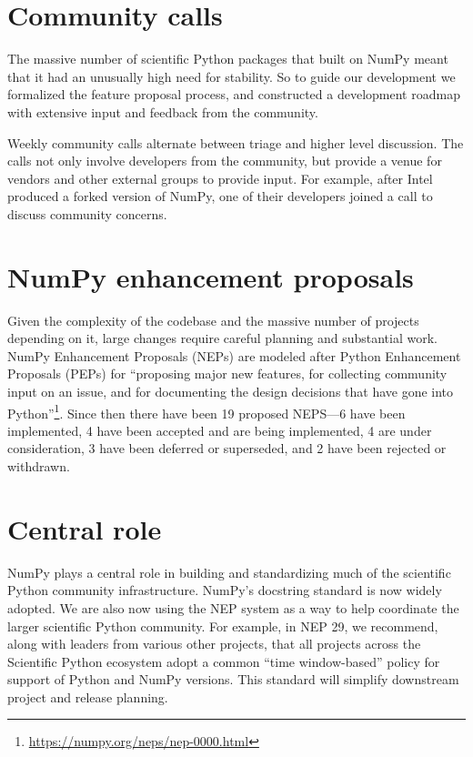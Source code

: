 \section*{Community calls}

The massive number of scientific Python packages that
built on NumPy meant that it had an unusually high need for stability.
So to guide our development we formalized the feature proposal process, and
constructed a development roadmap with extensive input and feedback from the
community.


Weekly community calls alternate between triage and
higher level discussion.  The calls not only involve developers from
the community, but provide a venue for vendors and other external
groups to provide input.  For example, after Intel produced a forked
version of NumPy, one of their developers joined a call to discuss
community concerns.

\section*{NumPy enhancement proposals}

Given the complexity of the codebase and the massive number of projects depending
on it, large changes require careful planning and substantial work.
NumPy Enhancement Proposals (NEPs) are modeled after
Python Enhancement Proposals (PEPs) for ``proposing major new
features, for collecting community input on an issue, and for
documenting the design decisions that have gone into
Python''\footnote{\url{https://numpy.org/neps/nep-0000.html}}.
Since then there have been 19 proposed NEPS---6 have been implemented,
4 have been accepted and are being implemented, 4 are under
consideration, 3 have been deferred or superseded, and 2 have been rejected
or withdrawn.


\section*{Central role}

NumPy plays a central role in building and standardizing much of the scientific
Python community infrastructure.
NumPy's docstring standard is now widely adopted.
We are also now using the NEP system as a way to help coordinate the larger
scientific Python community.
For example, in NEP 29, we recommend, along with leaders from various other
projects, that all projects across the Scientific Python ecosystem adopt a
common ``time window-based'' policy for support of Python and NumPy versions.
This standard will simplify downstream project and release planning.

